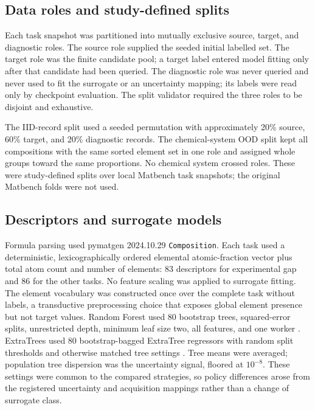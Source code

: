 \documentclass[10pt]{article}
\begin{document}
\subsection{Data roles and study-defined splits}
Each task snapshot was partitioned into mutually exclusive source, target, and
diagnostic roles. The source role supplied the seeded initial labelled set.
The target role was the finite candidate pool; a target label entered model
fitting only after that candidate had been queried. The diagnostic role was
never queried and never used to fit the surrogate or an uncertainty mapping;
its labels were read only by checkpoint evaluation. The split validator
required the three roles to be disjoint and exhaustive.

The IID-record split used a seeded permutation with approximately 20\% source,
60\% target, and 20\% diagnostic records. The chemical-system OOD split kept
all compositions with the same sorted element set in one role and assigned
whole groups toward the same proportions. No chemical system crossed roles.
These were study-defined splits over local Matbench task snapshots; the
original Matbench folds were not used.

\subsection{Descriptors and surrogate models}
Formula parsing used pymatgen 2024.10.29 \texttt{Composition}. Each task used
a deterministic, lexicographically ordered elemental atomic-fraction vector
plus total atom count and number of elements: 83 descriptors for experimental
gap and 86 for the other tasks. No feature scaling was applied to surrogate
fitting. The element vocabulary was constructed once over the complete task
without labels, a transductive preprocessing choice that exposes global
element presence but not target values. Random Forest used 80 bootstrap trees, squared-error splits,
unrestricted depth, minimum leaf size two, all features, and one worker
\citep{breiman2001rf,meinshausen2006qrf,wager2014confidence,mentch2016uncertainty}.
ExtraTrees used 80 bootstrap-bagged ExtraTree regressors with random split
thresholds and otherwise matched tree settings
\citep{geurts2006extratrees}. Tree means were averaged; population tree
dispersion was the uncertainty signal, floored at $10^{-8}$. These settings
were common to the compared strategies, so policy differences arose from the
registered uncertainty and acquisition mappings rather than a change of
surrogate class.
\end{document}
